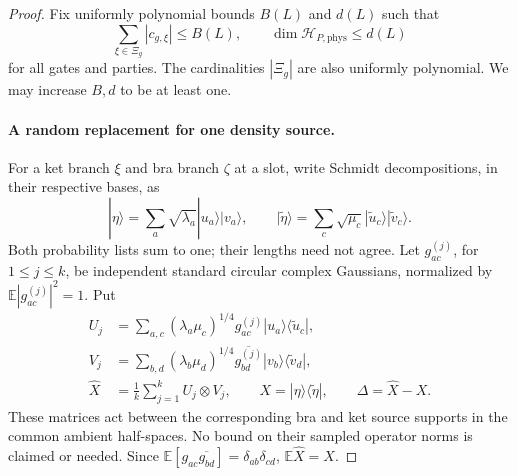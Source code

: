 \begin{proof}
Fix uniformly polynomial bounds $B(L)$ and $d(L)$ such that
\begin{equation}
 \sum_{\xi\in\Xi_g}|c_{g,\xi}|\le B(L),
 \qquad
 \dim\mathcal H_{P,\mathrm{phys}}\le d(L)
 \label{eq:compression-polynomial-bounds}
\end{equation}
for all gates and parties.  The cardinalities $|\Xi_g|$ are also
uniformly polynomial.  We may increase $B,d$ to be at least one.

\paragraph{A random replacement for one density source.}
For a ket branch $\xi$ and bra branch $\zeta$ at a slot, write Schmidt
decompositions, in their respective bases, as
\[
 |\eta\rangle=\sum_a\sqrt{\lambda_a}
                      |u_a\rangle|v_a\rangle,
 \qquad
 |\widetilde\eta\rangle=\sum_c\sqrt{\mu_c}
                      |\widetilde u_c\rangle
                      |\widetilde v_c\rangle.
\]
Both probability lists sum to one; their lengths need not agree.  Let
$g_{ac}^{(j)}$, for $1\le j\le k$, be independent standard circular
complex Gaussians, normalized by $\mathbb E|g_{ac}^{(j)}|^2=1$.  Put
\begin{align}
 U_j&=\sum_{a,c}(\lambda_a\mu_c)^{1/4}g_{ac}^{(j)}
             |u_a\rangle\langle\widetilde u_c|,\nonumber\\
 V_j&=\sum_{b,d}(\lambda_b\mu_d)^{1/4}
                    \overline{g_{bd}^{(j)}}
             |v_b\rangle\langle\widetilde v_d|,\nonumber\\
 \widehat X&=\frac1k\sum_{j=1}^k U_j\otimes V_j,
 \qquad X=|\eta\rangle\langle\widetilde\eta|,
 \qquad \Delta=\widehat X-X.
 \label{eq:compression-random-source}
\end{align}
These matrices act between the corresponding bra and ket source
supports in the common ambient half-spaces.  No bound on their sampled
operator norms is claimed or needed.  Since
$\mathbb E[g_{ac}\overline{g_{bd}}]=\delta_{ab}\delta_{cd}$,
$\mathbb E\widehat X=X$.


\end{proof}
